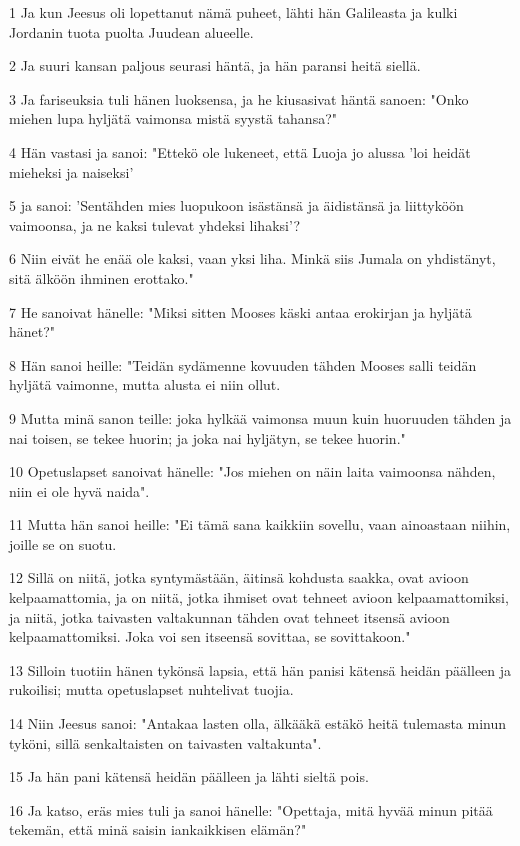 \par 1 Ja kun Jeesus oli lopettanut nämä puheet, lähti hän Galileasta ja kulki Jordanin tuota puolta Juudean alueelle.
\par 2 Ja suuri kansan paljous seurasi häntä, ja hän paransi heitä siellä.
\par 3 Ja fariseuksia tuli hänen luoksensa, ja he kiusasivat häntä sanoen: "Onko miehen lupa hyljätä vaimonsa mistä syystä tahansa?"
\par 4 Hän vastasi ja sanoi: "Ettekö ole lukeneet, että Luoja jo alussa 'loi heidät mieheksi ja naiseksi'
\par 5 ja sanoi: 'Sentähden mies luopukoon isästänsä ja äidistänsä ja liittyköön vaimoonsa, ja ne kaksi tulevat yhdeksi lihaksi'?
\par 6 Niin eivät he enää ole kaksi, vaan yksi liha. Minkä siis Jumala on yhdistänyt, sitä älköön ihminen erottako."
\par 7 He sanoivat hänelle: "Miksi sitten Mooses käski antaa erokirjan ja hyljätä hänet?"
\par 8 Hän sanoi heille: "Teidän sydämenne kovuuden tähden Mooses salli teidän hyljätä vaimonne, mutta alusta ei niin ollut.
\par 9 Mutta minä sanon teille: joka hylkää vaimonsa muun kuin huoruuden tähden ja nai toisen, se tekee huorin; ja joka nai hyljätyn, se tekee huorin."
\par 10 Opetuslapset sanoivat hänelle: "Jos miehen on näin laita vaimoonsa nähden, niin ei ole hyvä naida".
\par 11 Mutta hän sanoi heille: "Ei tämä sana kaikkiin sovellu, vaan ainoastaan niihin, joille se on suotu.
\par 12 Sillä on niitä, jotka syntymästään, äitinsä kohdusta saakka, ovat avioon kelpaamattomia, ja on niitä, jotka ihmiset ovat tehneet avioon kelpaamattomiksi, ja niitä, jotka taivasten valtakunnan tähden ovat tehneet itsensä avioon kelpaamattomiksi. Joka voi sen itseensä sovittaa, se sovittakoon."
\par 13 Silloin tuotiin hänen tykönsä lapsia, että hän panisi kätensä heidän päälleen ja rukoilisi; mutta opetuslapset nuhtelivat tuojia.
\par 14 Niin Jeesus sanoi: "Antakaa lasten olla, älkääkä estäkö heitä tulemasta minun tyköni, sillä senkaltaisten on taivasten valtakunta".
\par 15 Ja hän pani kätensä heidän päälleen ja lähti sieltä pois.
\par 16 Ja katso, eräs mies tuli ja sanoi hänelle: "Opettaja, mitä hyvää minun pitää tekemän, että minä saisin iankaikkisen elämän?"
